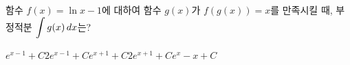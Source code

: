 함수 $f(x)=\ln x-1$에 대하여 함수 $g(x)$가 $f(g(x))=x$를 만족시킬 때, 부정적분 $\displaystyle\int g(x)\mkern3mu dx$는? 
\begin{choices32}{$e^{x-1}+C$}{$2e^{x-1}+C$}{$e^{x+1}+C$}{$2e^{x+1}+C$}{$e^x-x+C$}\end{choices32}
